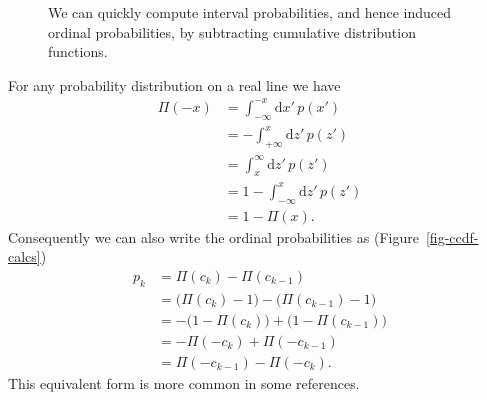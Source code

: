 \documentclass[
  letterpaper,
  DIV=11,
  numbers=noendperiod]{scrartcl}
\begin{document}
\begin{figure}


\caption{\label{fig-cdf-calcs}We can quickly compute interval
probabilities, and hence induced ordinal probabilities, by subtracting
cumulative distribution functions.}

\end{figure}%

For any probability distribution on a real line we have \begin{align*}
\Pi(-x)
&=
\int_{-\infty}^{-x} \mathrm{d} x' \, p(x')
\\
&=
-\int_{+\infty}^{x} \mathrm{d} z' \, p(z')
\\
&=
\int_{x}^{\infty} \mathrm{d} z' \, p(z')
\\
&=
1 - \int_{-\infty}^{x} \mathrm{d} z' \, p(z')
\\
&=
1 - \Pi(x).
\end{align*} Consequently we can also write the ordinal probabilities as
(Figure~\ref{fig-ccdf-calcs}) \begin{align*}
p_{k}
&=
\Pi(c_{k}) - \Pi(c_{k - 1})
\\
&=
\big( \Pi(c_{k}) - 1 \big) - \big( \Pi(c_{k - 1}) - 1 \big)
\\
&=
- \big( 1 - \Pi(c_{k}) \big) + \big( 1 - \Pi(c_{k - 1}) \big)
\\
&=
- \Pi(-c_{k}) + \Pi(-c_{k - 1})
\\
&=
\Pi(-c_{k - 1}) - \Pi(-c_{k}).
\end{align*} This equivalent form is more common in some references.
\end{document}
